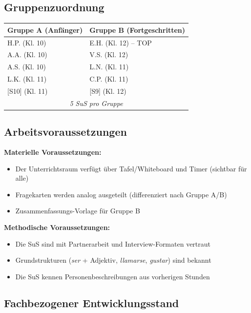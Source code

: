 \documentclass[11pt, a4paper]{article}
\newcommand{\es}[1]{\textcolor{spanisch}{\textit{#1}}}
\begin{document}
\subsection{Gruppenzuordnung}

\begin{center}
\begin{tabular}{|l|l|}
    \hline
    \textbf{Gruppe A (Anfänger)} & \textbf{Gruppe B (Fortgeschritten)} \\
    \hline
    H.P. (Kl. 10) & E.H. (Kl. 12) -- TOP \\
    A.A. (Kl. 10) & V.S. (Kl. 12) \\
    A.S. (Kl. 10) & L.N. (Kl. 11) \\
    L.K. (Kl. 11) & C.P. (Kl. 11) \\
    {[S10]} (Kl. 11) & {[S9]} (Kl. 12) \\
    \hline
    \multicolumn{2}{|c|}{\textit{5 SuS pro Gruppe}} \\
    \hline
\end{tabular}
\end{center}

\subsection{Arbeitsvoraussetzungen}

\textbf{Materielle Voraussetzungen:}
\begin{itemize}[leftmargin=2em]
    \item Der Unterrichtsraum verfügt über Tafel/Whiteboard und Timer (sichtbar für alle)
    \item Fragekarten werden analog ausgeteilt (differenziert nach Gruppe A/B)
    \item Zusammenfassungs-Vorlage für Gruppe B
\end{itemize}

\textbf{Methodische Voraussetzungen:}
\begin{itemize}[leftmargin=2em]
    \item Die SuS sind mit Partnerarbeit und Interview-Formaten vertraut
    \item Grundstrukturen (\es{ser} + Adjektiv, \es{llamarse}, \es{gustar}) sind bekannt
    \item Die SuS kennen Personenbeschreibungen aus vorherigen Stunden
\end{itemize}

\subsection{Fachbezogener Entwicklungsstand}
\end{document}
